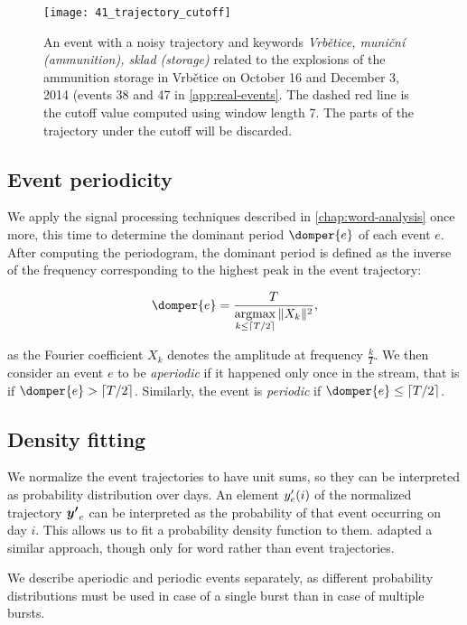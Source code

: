 \begin{figure}
  \centering
  \texttt{[image: 41\_trajectory\_cutoff]}  %
  \caption{An event with a noisy trajectory and keywords \textit{Vrbětice, muniční (ammunition), sklad (storage)} related to the explosions of the ammunition storage in Vrbětice on October 16 and December 3, 2014 (events 38 and 47 in \autoref{app:real-events}. The dashed red line is the cutoff value computed using window length 7. The parts of the trajectory under the cutoff will be discarded.}
  \label{fig:vrbetice-trajectory}
\end{figure}


\subsection{Event periodicity}
We apply the signal processing techniques described in \autoref{chap:word-analysis} once more, this time to determine the dominant period $\domper{e}$ of each event $e$. After computing the periodogram, the dominant period is defined as the inverse of the frequency corresponding to the highest peak in the event trajectory:

\begin{equation}
	\domper{e} = \frac{\streamlen}{\argmax\limits_{k \leq \ceil{\streamlen / 2}}{\|X_{k}\|^{2}}},
\end{equation}

as the Fourier coefficient $X_{k}$ denotes the amplitude at frequency $\frac{k}{T}$. We then consider an event $e$ to be \textit{aperiodic} if it happened only once in the stream, that is if $\domper{e} > \ceil{\streamlen / 2}$. Similarly, the event is \textit{periodic} if $\domper{e} \leq \ceil{\streamlen / 2}$.

\subsection{Density fitting}
We normalize the event trajectories to have unit sums, so they can be interpreted as probability distribution over days. An element $y'_{e}(i)$ of the normalized trajectory $\vect{\trajn}_{e}$ can be interpreted as the probability of that event occurring on day $i$. This allows us to fit a probability density function to them. \cite{event-detection} adapted a similar approach, though only for word rather than event trajectories.

We describe aperiodic and periodic events separately, as different probability distributions must be used in case of a single burst than in case of multiple bursts.


